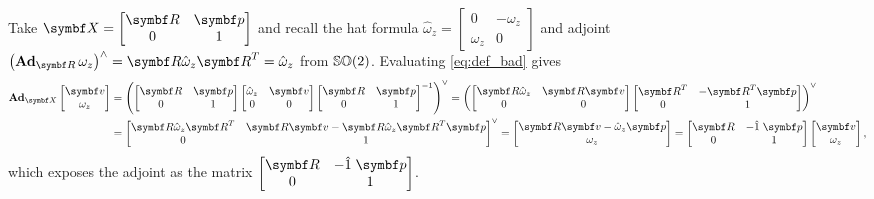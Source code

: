 Take $\X = \begin{bmatrix} \bR & \bp \\ 0 & 1 \end{bmatrix}$ and recall the hat formula $\hat \omega_{z} = \begin{bmatrix} 0 & -\omega_{z} \\ \omega_{z} & 0 \end{bmatrix}$ and adjoint $\left(\bAd_{\bR} \omega_{z} \right)^{\wedge} = \bR \hat \omega_{z} \bR^{T} = \hat \omega_{z}$ from ${\mathbb{SO}(2)}$. Evaluating \eqref{eq:def_bad} gives
\begin{equation}
  \begin{aligned}
    \bAd_{\X} \begin{bmatrix} \bv \\ \omega_{z} \end{bmatrix}
     & = \left( \begin{bmatrix} \bR & \bp \\ 0 & 1 \end{bmatrix}
    \begin{bmatrix}
      \hat \omega_{z} & \bv \\ 0 & 0
    \end{bmatrix}
    \begin{bmatrix} \bR & \bp \\ 0 & 1 \end{bmatrix}^{-1} \right)^{\vee}
    = \left( \begin{bmatrix} \bR \hat \omega_{z} & \bR \bv \\ 0 & 0 \end{bmatrix}
    \begin{bmatrix} \bR^{T} & -\bR^{T} \bp \\ 0 & 1 \end{bmatrix} \right)^{\vee} \\
     & = \begin{bmatrix} \bR \hat \omega_{z} \bR^{T} & \bR \bv - \bR \hat \omega_{z} \bR^{T} \bp \\ 0 & 1 \end{bmatrix}^{\vee}
    = \begin{bmatrix} \bR \bv - \hat \omega_{z} \bp \\ \omega_{z} \end{bmatrix} =
    \begin{bmatrix}
      \bR & -\hat 1 \; \bp
      \\ 0 & 1
    \end{bmatrix}
    \begin{bmatrix} \bv \\ \omega_{z} \end{bmatrix}
    ,
  \end{aligned}
\end{equation}
which exposes the adjoint as the matrix $\begin{bmatrix} \bR & -\hat 1 \; \bp \\ 0 & 1 \end{bmatrix}$.

